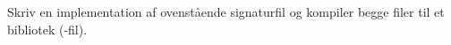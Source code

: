 Skriv en implementation af ovenstående signaturfil og kompiler begge filer til et bibliotek (-fil).
